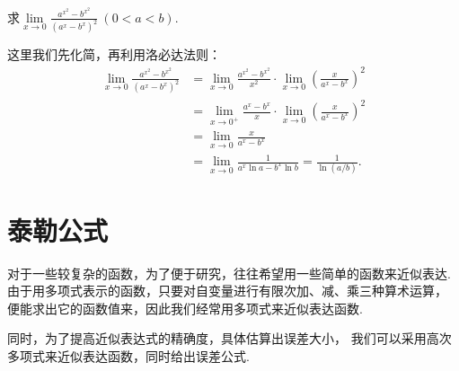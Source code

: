 \begin{example}
\def\l{\lim\limits_{x\to0}}%
求\(\l \frac{a^{x^2}-b^{x^2}}{(a^x-b^x)^2}\ (0<a<b)\).
\begin{solution}
这里我们先化简，再利用洛必达法则：\begin{align*}
\l \frac{a^{x^2}-b^{x^2}}{(a^x-b^x)^2}
&= \l \frac{a^{x^2}-b^{x^2}}{x^2} \cdot \l \left(\frac{x}{a^x-b^x}\right)^2 \\
&= \lim\limits_{x\to0^+} \frac{a^x-b^x}{x} \cdot \l \left(\frac{x}{a^x-b^x}\right)^2 \\
&= \l \frac{x}{a^x-b^x} \\
&= \l \frac{1}{a^x \ln a - b^x \ln b}
= \frac{1}{\ln(a/b)}.
\end{align*}
\end{solution}
\end{example}

\section{泰勒公式}\label{section:微分中值定理.泰勒公式}
对于一些较复杂的函数，为了便于研究，往往希望用一些简单的函数来近似表达.
由于用多项式表示的函数，只要对自变量进行有限次加、减、乘三种算术运算，
便能求出它的函数值来，因此我们经常用多项式来近似表达函数.

同时，为了提高近似表达式的精确度，具体估算出误差大小，
我们可以采用高次多项式来近似表达函数，同时给出误差公式.

